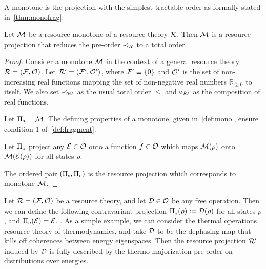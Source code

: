\documentclass[pra,
aps,
twocolumn,
superscriptaddress,
groupedaddress,
nofootinbib,
reprint
]{revtex4-1}
\begin{document}
A monotone is the projection with the simplest tractable order as formally stated in~\cref{thm:monofrag}.
\begin{proposition}\label{thm:monofrag}
	Let $\mathcal{M}$ be a resource monotone of a resource theory $\mathcal{R}$. 
	Then $\mathcal{M}$ is a resource projection that reduces the pre-order $\prec_{\mathcal{R}}$ to a total order.
\end{proposition}
\begin{proof}
	Consider a monotone $\mathcal{M}$ in the context of a general resource theory $\mathcal{R} = (\mathcal{F}, \mathcal{O})$.
	Let $\mathcal{R}' = (\mathcal{F}', \mathcal{O}')$, where $\mathcal{F}' \equiv \{0\}$ and $\mathcal{O}'$ is the set of non-increasing real functions mapping the set of non-negative real numbers $\mathbb{R}_{\geq 0}$ to itself. 
	We also set $\prec_{\mathcal{R}'}$ as the usual total order $\leq$ and $\circ_{\mathcal{R}'}$ as the composition of real functions.
	
	Let $\Pi_{\rm{s}} = \mathcal{M}$.
	The defining properties of a monotone, given in~\cref{def:mono}, ensure condition 1 of~\cref{def:fragment}. 
	
	Let $\Pi_{\rm{o}}$ project any $\mathcal{E} \in \mathcal{O}$ onto a function $f \in \mathcal{O}$ which maps $\mathcal{M}(\rho)$ onto $\mathcal{M}(\mathcal{E}(\rho))$ for all states $\rho$.
	
	The ordered pair $(\Pi_{\rm{s}}, \Pi_{\rm{o}})$ is the resource projection which corresponds to monotone $\mathcal{M}$.
\end{proof}

\begin{example}Let $\mathcal{R} = (\mathcal{F},\mathcal{O})$ be a resource theory, and let $\mathcal{D} \in \mathcal{O}$ be any free operation. Then we can define the following contravariant projection $\Pi_s( \rho) := \mathcal{D}(\rho)$ for all states $\rho$, and $\Pi_o (\mathcal{E}) = \mathcal{E}$. . As a simple example, we can consider the thermal operations resource theory of thermodynamics, and take $\mathcal{D}$ to be the dephasing map that kills off coherences between energy eigenspaces. Then the resource projection $\mathcal{R}'$ induced by $\mathcal{D}$ is fully described by the thermo-majorization pre-order on distributions over energies.
\end{example}
\end{document}
